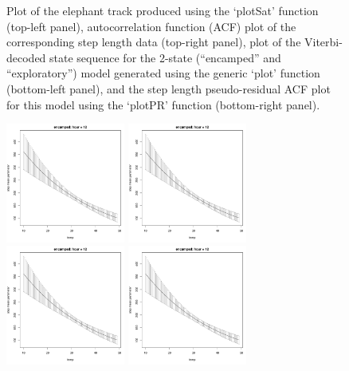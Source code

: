 \documentclass[12pt]{article}
\begin{document}
\begin{figure}[htbp]
  \caption{Plot of the elephant track produced using the `plotSat' function (top-left panel), autocorrelation function (ACF) plot of the corresponding step length data (top-right panel), plot of the Viterbi-decoded state sequence for the 2-state (``encamped'' and ``exploratory'') model generated using the generic `plot' function (bottom-left panel), and the step length pseudo-residual ACF plot for this model using the `plotPR' function (bottom-right panel).}
  \label{fig:elephantResults1}
\end{figure}

\begin{figure}[htbp]
  \centering
  \includegraphics[width=0.35\textwidth,page=9]{plot_elephantResults}
  \includegraphics[width=0.35\textwidth,page=12]{plot_elephantResults} \\
  \includegraphics[width=0.35\textwidth,page=1]{plot_elephantResults} 
  \includegraphics[width=0.35\textwidth,page=2]{plot_elephantResults} \\

\end{figure}
\end{document}
